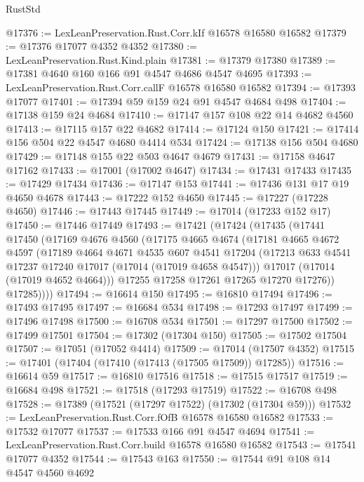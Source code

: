 \begin{lexlean}{RustStd}
\begin{coremodule}
{\begin{coremodule}
{{{{{{{{{{{{{{{{{{{{{{{{{{{{{{{{{{{{{{{{{{{{{{{{{{{{{{{@17376 := LexLeanPreservation.Rust.Corr.kIf @16578 @16580 @16582
@17379 := @17376 @17077 @4352 @4352
@17380 := LexLeanPreservation.Rust.Kind.plain
@17381 := @17379 @17380
@17389 := @17381 @4640 @160 @166 @91 @4547 @4686 @4547 @4695
@17393 := LexLeanPreservation.Rust.Corr.callF @16578 @16580 @16582
@17394 := @17393 @17077
@17401 := @17394 @59 @159 @24 @91 @4547 @4684 @498
@17404 := @17138 @159 @24 @4684
@17410 := @17147 @157 @108 @22 @14 @4682 @4560
@17413 := @17115 @157 @22 @4682
@17414 := @17124 @150
@17421 := @17414 @156 @504 @22 @4547 @4680 @4414 @534
@17424 := @17138 @156 @504 @4680
@17429 := @17148 @155 @22 @503 @4647 @4679
@17431 := @17158 @4647 @17162
@17433 := @17001 (@17002 @4647)
@17434 := @17431 @17433
@17435 := @17429 @17434
@17436 := @17147 @153
@17441 := @17436 @131 @17 @19 @4650 @4678
@17443 := @17222 @152 @4650
@17445 := @17227 (@17228 @4650)
@17446 := @17443 @17445
@17449 := @17014 (@17233 @152 @17)
@17450 := @17446 @17449
@17493 := @17421
    (@17424
      (@17435
        (@17441
          @17450
          (@17169
            @4676
            @4560
            (@17175
              @4665
              @4674
              (@17181
                @4665
                @4672
                @4597
                (@17189
                  @4664
                  @4671
                  @4535
                  @607
                  @4541
                  @17204
                  (@17213 @633 @4541 @17237 @17240 @17017 (@17014 (@17019 @4658 @4547)))
                  @17017
                  (@17014 (@17019 @4652 @4664)))
                @17255
                @17258
                @17261
                @17265
                @17270
                @17276))
            @17285))))
@17494 := @16614 @150
@17495 := @16810 @17494
@17496 := @17493 @17495
@17497 := @16684 @534
@17498 := @17293 @17497
@17499 := @17496 @17498
@17500 := @16708 @534
@17501 := @17297 @17500
@17502 := @17499 @17501
@17504 := @17302 (@17304 @150)
@17505 := @17502 @17504
@17507 := @17051 (@17052 @4414)
@17509 := @17014 (@17507 @4352)
@17515 := @17401 (@17404 (@17410 (@17413 (@17505 @17509)) @17285))
@17516 := @16614 @59
@17517 := @16810 @17516
@17518 := @17515 @17517
@17519 := @16684 @498
@17521 := @17518 (@17293 @17519)
@17522 := @16708 @498
@17528 := @17389 (@17521 (@17297 @17522) (@17302 (@17304 @59)))
@17532 := LexLeanPreservation.Rust.Corr.fOfB @16578 @16580 @16582
@17533 := @17532 @17077
@17537 := @17533 @166 @91 @4547 @4694
@17541 := LexLeanPreservation.Rust.Corr.build @16578 @16580 @16582
@17543 := @17541 @17077 @4352
@17544 := @17543 @163
@17550 := @17544 @91 @108 @14 @4547 @4560 @4692
}}}}}}}}}}}}}}}}}}}}}}}}}}}}}}}}}}}}}}}}}}}}}}}}}}}}}}}
\end{coremodule}}
\end{coremodule}
\end{lexlean}
